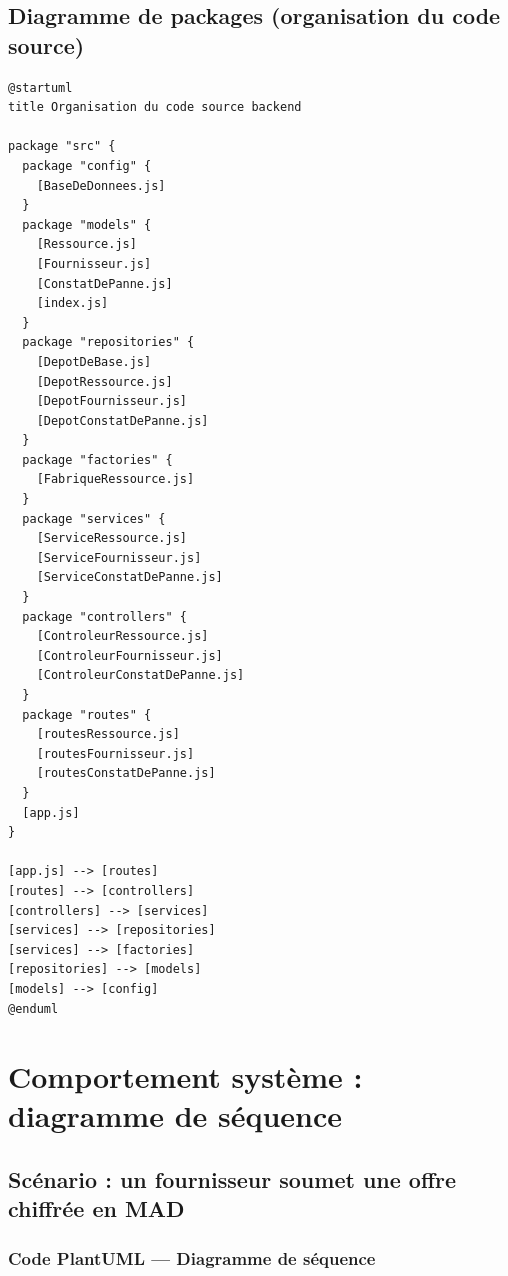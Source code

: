 \documentclass[a4paper,11pt,openany]{report}
\begin{document}
\section{Diagramme de packages (organisation du code source)}

\begin{lstlisting}[caption={Diagramme UML --- Packages backend},
                   label={lst:umlPackages}]
@startuml
title Organisation du code source backend

package "src" {
  package "config" {
    [BaseDeDonnees.js]
  }
  package "models" {
    [Ressource.js]
    [Fournisseur.js]
    [ConstatDePanne.js]
    [index.js]
  }
  package "repositories" {
    [DepotDeBase.js]
    [DepotRessource.js]
    [DepotFournisseur.js]
    [DepotConstatDePanne.js]
  }
  package "factories" {
    [FabriqueRessource.js]
  }
  package "services" {
    [ServiceRessource.js]
    [ServiceFournisseur.js]
    [ServiceConstatDePanne.js]
  }
  package "controllers" {
    [ControleurRessource.js]
    [ControleurFournisseur.js]
    [ControleurConstatDePanne.js]
  }
  package "routes" {
    [routesRessource.js]
    [routesFournisseur.js]
    [routesConstatDePanne.js]
  }
  [app.js]
}

[app.js] --> [routes]
[routes] --> [controllers]
[controllers] --> [services]
[services] --> [repositories]
[services] --> [factories]
[repositories] --> [models]
[models] --> [config]
@enduml
\end{lstlisting}

\chapter{Comportement système : diagramme de séquence}

\section{Scénario : un fournisseur soumet une offre chiffrée en MAD}

\subsection{Code PlantUML --- Diagramme de séquence}
\end{document}
